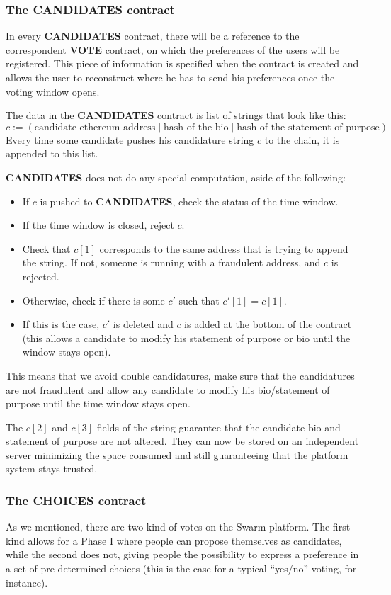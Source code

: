 \documentclass[submission, copyright,creativecommons,sharealike,noncommercial]{eptcs}
\newcommand{\Candidates}{\textbf{CANDIDATES}\xspace}
\newcommand{\Choices}{\textbf{CHOICES}\xspace}
\newcommand{\Vote}{\textbf{VOTE}\xspace}
\begin{document}
\subsubsection{The \Candidates contract}
	In every \Candidates contract, there will be a reference to the correspondent \Vote contract, on which the preferences of the users will be registered. This piece of information is specified when the contract is created and allows the user to reconstruct where he has to send his preferences once the voting window opens.
	
	The data in the \Candidates contract is list of strings that look like this: 
	\[
		c := (\text{candidate ethereum address} \mid \text{hash of the bio} \mid \text{hash of the statement of purpose})
	\]
	Every time some candidate pushes his candidature string $c$ to the chain, it is appended to this list. 
	
	\Candidates does not do any special computation, aside of the following:
	\begin{itemize}
		\item If $c$ is pushed to \Candidates, check the status of the time window.
		\item If the time window is closed, reject $c$.
		\item Check that $c[1]$ corresponds to the same address that is trying to append the string. If not, someone is running with a fraudulent address, and $c$ is rejected.
		\item Otherwise, check if there is some $c'$ such that $c'[1] = c[1]$.
		\item If this is the case, $c'$ is deleted and $c$ is added at the bottom of the contract (this allows a candidate to modify his statement of purpose or bio until the window stays open).
	\end{itemize}
%
	This means that we avoid double candidatures, make sure that the candidatures are not fraudulent and allow any candidate to modify his bio/statement of purpose until the time window stays open.

	The $c[2]$ and $c[3]$ fields of the string guarantee that the candidate bio and statement of purpose are not altered. They can now be stored on an independent server minimizing the space consumed and still guaranteeing that the platform system stays trusted.	 
%
%
\subsubsection{The \Choices contract}
	As we mentioned, there are two kind of votes on the Swarm platform. The first kind allows for a Phase I where people can propose themselves as candidates, while the second does not, giving people the possibility to express a preference in a set of pre-determined choices (this is the case for a typical ``yes/no'' voting, for instance).
	
\end{document}
